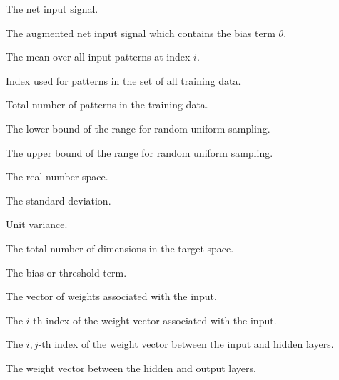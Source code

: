 \begin{description}
    \item
    [\parbox{1cm}{$net$}] The net input signal.

    \item
    [\parbox{1cm}{$net'$}] The augmented net input signal which contains the bias term $\theta$.

    \item
    [\parbox{1cm}{$\mu_i$}] The mean over all input patterns at index $i$.

    \item
    [\parbox{1cm}{$p$}] Index used for patterns in the set of all training data.

    \item
    [\parbox{1cm}{$P$}] Total number of patterns in the training data.

    \item
    [\parbox{1cm}{$\omega_{min}$}] The lower bound of the range for random uniform sampling.

    \item
    [\parbox{1cm}{$\omega_{max}$}] The upper bound of the range for random uniform sampling.

    \item
    [\parbox{1cm}{$\mathbb{R}$}] The real number space.

    \item
    [\parbox{1cm}{$\sigma$}] The standard deviation.

    \item
    [\parbox{1cm}{$\sigma_i^2$}] Unit variance.

    \item
    [\parbox{1cm}{$T$}] The total number of dimensions in the target space.

    \item
    [\parbox{1cm}{$\theta$}] The bias or threshold term.

    \item
    [\parbox{1cm}{$\vec{v}$}] The vector of weights associated with the input.

    \item
    [\parbox{1cm}{$v_i$}] The $i$-th index of the weight vector associated with the input.

    \item
    [\parbox{1cm}{$v_{i,j}$}] The $i,j$-th index of the weight vector between the input and hidden layers.

    \item
    [\parbox{1cm}{$\vec{w}$}] The weight vector between the hidden and output layers.


\end{description}
